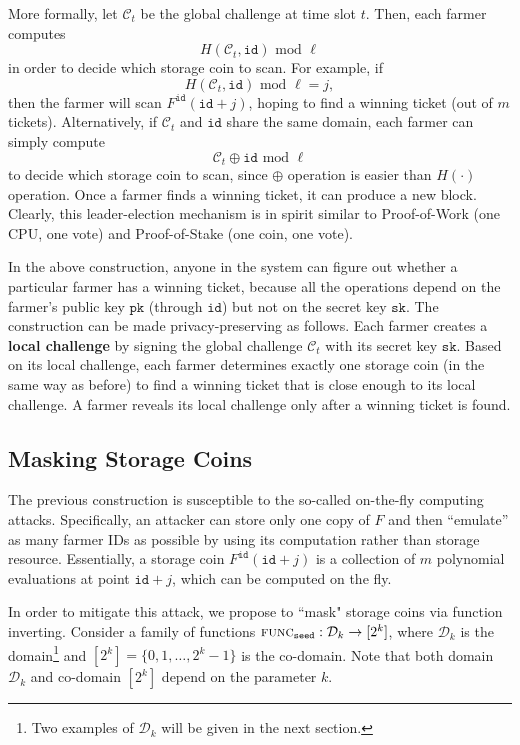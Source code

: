 \documentclass[conference]{IEEEtran}
\newcommand{\sk}{\texttt{sk}}
\newcommand{\pk}{\texttt{pk}}
\newcommand{\id}{\texttt{id}}
\newcommand{\seed}{\texttt{seed}}
\newcommand{\func}{\textsc{func}}
\begin{document}
More formally, let $\mathcal{C}_t$ be the global challenge at time slot $t$. Then, each farmer computes
\[
H(\mathcal{C}_t, \id) \mbox{ mod } \ell
\]
in order to decide which storage coin to scan.
For example, if 
\[
H(\mathcal{C}_t, \id) \mbox{ mod } \ell = j,
\]
then the farmer will scan $F^{\id}(\id + j)$, hoping to find a winning ticket (out of $m$ tickets). 
Alternatively, if $\mathcal{C}_t$ and $\id$ share the same domain, each farmer can simply compute
\[
\mathcal{C}_t \oplus \id \mbox{ mod } \ell
\]
to decide which storage coin to scan, since $\oplus$ operation is easier than $H(\cdot)$ operation. 
Once a farmer finds a winning ticket, it can produce a new block.
Clearly, this leader-election mechanism is in spirit similar to Proof-of-Work (one CPU, one vote) and Proof-of-Stake (one coin, one vote).

In the above construction, anyone in the system can figure out whether a particular farmer has a winning ticket, because all the operations depend on the farmer's public key $\pk$ (through $\id$) but not on the secret key $\sk$.  
The construction can be made privacy-preserving as follows. 
Each farmer creates a {\bf local challenge} by signing the global challenge $\mathcal{C}_t$ with its secret key $\sk$. Based on its local challenge, each farmer determines exactly one storage coin (in the same way as before) to find a winning ticket that is close enough to its local challenge. A farmer reveals its local challenge only after a winning ticket is found.

\subsection{Masking Storage Coins}

The previous construction is susceptible to the so-called on-the-fly computing attacks. Specifically, an attacker can store only one copy of $F$
and then ``emulate'' as many farmer IDs as possible by using its computation rather than storage resource.
Essentially, a storage coin $F^{\id}(\id + j)$ is a collection of $m$ polynomial evaluations at point $\id + j$, which can be computed on the fly. 

In order to mitigate this attack, we propose to ``mask" storage coins via function inverting. 
Consider a family of functions $\func_{\seed}: \mathcal{D}_k \to [2^k]$, where $\mathcal{D}_k$ is the domain\footnote{Two examples of $\mathcal{D}_k$ will be given in the next section.} and 
$[2^k] = \{0, 1, \ldots, 2^k - 1 \}$ is the co-domain. Note that both domain $\mathcal{D}_k$ and co-domain $[2^k]$  depend on the parameter $k$.
\end{document}
